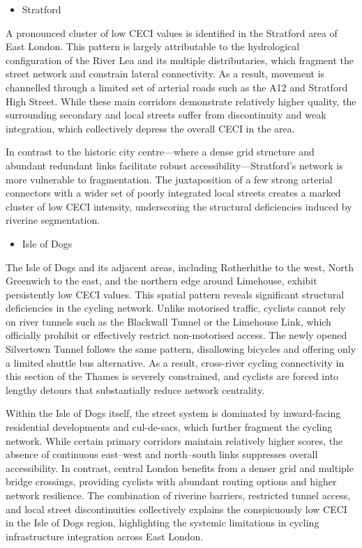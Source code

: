 \documentclass[
  12pt,
  oneside]{book}
\providecommand{\tightlist}{%
  \setlength{\itemsep}{0pt}\setlength{\parskip}{0pt}}
\begin{document}
\begin{itemize}
\tightlist
\item
  Stratford
\end{itemize}

A pronounced cluster of low CECI values is identified in the Stratford area of East London. This pattern is largely attributable to the hydrological configuration of the River Lea and its multiple distributaries, which fragment the street network and constrain lateral connectivity. As a result, movement is channelled through a limited set of arterial roads such as the A12 and Stratford High Street. While these main corridors demonstrate relatively higher quality, the surrounding secondary and local streets suffer from discontinuity and weak integration, which collectively depress the overall CECI in the area.

In contrast to the historic city centre---where a dense grid structure and abundant redundant links facilitate robust accessibility---Stratford's network is more vulnerable to fragmentation. The juxtaposition of a few strong arterial connectors with a wider set of poorly integrated local streets creates a marked cluster of low CECI intensity, underscoring the structural deficiencies induced by riverine segmentation.

\begin{itemize}
\tightlist
\item
  Isle of Dogs
\end{itemize}

The Isle of Dogs and its adjacent areas, including Rotherhithe to the west, North Greenwich to the east, and the northern edge around Limehouse, exhibit persistently low CECI values. This spatial pattern reveals significant structural deficiencies in the cycling network. Unlike motorised traffic, cyclists cannot rely on river tunnels such as the Blackwall Tunnel or the Limehouse Link, which officially prohibit or effectively restrict non-motorised access. The newly opened Silvertown Tunnel follows the same pattern, disallowing bicycles and offering only a limited shuttle bus alternative. As a result, cross-river cycling connectivity in this section of the Thames is severely constrained, and cyclists are forced into lengthy detours that substantially reduce network centrality.

Within the Isle of Dogs itself, the street system is dominated by inward-facing residential developments and cul-de-sacs, which further fragment the cycling network. While certain primary corridors maintain relatively higher scores, the absence of continuous east--west and north--south links suppresses overall accessibility. In contrast, central London benefits from a denser grid and multiple bridge crossings, providing cyclists with abundant routing options and higher network resilience. The combination of riverine barriers, restricted tunnel access, and local street discontinuities collectively explains the conspicuously low CECI in the Isle of Dogs region, highlighting the systemic limitations in cycling infrastructure integration across East London.
\end{document}
